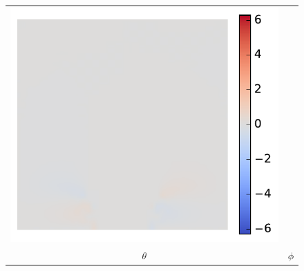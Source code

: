 \documentclass[11pt]{article}
\begin{document}
\begin{figure}[!h]
\begin{tabular}{cc}
         \includegraphics[scale=.5]{img/splitFlux/phi.pdf}
         \\
         $\theta $ & $\phi$ 
    \end{tabular}
\end{figure}
\pagebreak
\end{document}
